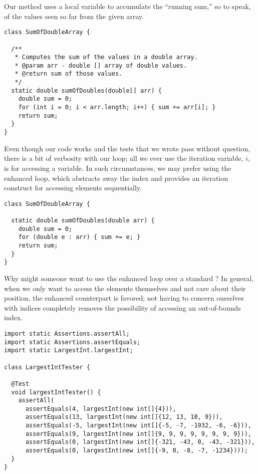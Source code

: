 Our method uses a local variable to accumulate the ``running sum,'' so to speak, of the values seen so far from the given array.

\begin{lstlisting}[language=MyJava]
class SumOfDoubleArray {

  /**
   * Computes the sum of the values in a double array.
   * @param arr - double [] array of double values.
   * @return sum of those values.
   */
  static double sumOfDoubles(double[] arr) {
    double sum = 0;
    for (int i = 0; i < arr.length; i++) { sum += arr[i]; }
    return sum;
  }
}
\end{lstlisting}

Even though our code works and the tests that we wrote pass without question, there is a bit of verbosity with our loop; all we ever use the iteration variable, $i$, is for accessing a variable. In such circumstances, we may prefer using the enhanced  loop, which abstracts away the index and provides an iteration construct for accessing elements sequentially.

\begin{lstlisting}[language=MyJava]
class SumOfDoubleArray {

  static double sumOfDoubles(double arr) {
    double sum = 0;
    for (double e : arr) { sum += e; }
    return sum;
  }
}
\end{lstlisting}

Why might someone want to use the enhanced  loop over a standard ? In general, when we only want to access the elements themselves and not care about their position, the enhanced counterpart is favored; not having to concern ourselves with indices completely removes the possibility of accessing an out-of-bounds index. 


\begin{lstlisting}[language=MyJava]
import static Assertions.assertAll;
import static Assertions.assertEquals;
import static LargestInt.largestInt;

class LargestIntTester {

  @Test
  void largestIntTester() {
    assertAll(
      assertEquals(4, largestInt(new int[]{4})), 
      assertEquals(13, largestInt(new int[]{12, 13, 10, 9})), 
      assertEquals(-5, largestInt(new int[]{-5, -7, -1932, -6, -6})), 
      assertEquals(9, largestInt(new int[]{9, 9, 9, 9, 9, 9, 9, 9})), 
      assertEquals(0, largestInt(new int[]{-321, -43, 0, -43, -321})), 
      assertEquals(0, largestInt(new int[]{-9, 0, -8, -7, -1234})));
  }
}
\end{lstlisting}


